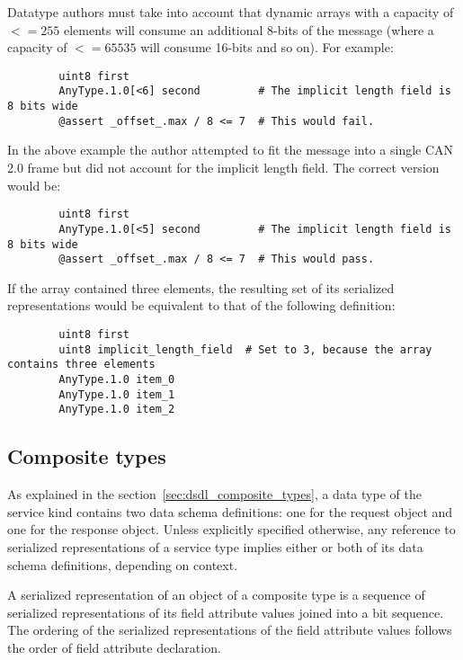 \begin{remark}
    Datatype authors must take into account that dynamic arrays with a capacity of $<=255$ elements will
    consume an additional 8-bits of the message (where a capacity of $<=65535$ will consume 16-bits and so on).
    For example:

    \begin{verbatim}
        uint8 first
        AnyType.1.0[<6] second         # The implicit length field is 8 bits wide
        @assert _offset_.max / 8 <= 7  # This would fail.
    \end{verbatim}

    In the above example the author attempted to fit the message into a single CAN 2.0 frame but
    did not account for the implicit length field. The correct version would be:

    \begin{verbatim}
        uint8 first
        AnyType.1.0[<5] second         # The implicit length field is 8 bits wide
        @assert _offset_.max / 8 <= 7  # This would pass.
    \end{verbatim}

    If the array contained three elements, the resulting set of its serialized representations would
    be equivalent to that of the following definition:

    \begin{verbatim}
        uint8 first
        uint8 implicit_length_field  # Set to 3, because the array contains three elements
        AnyType.1.0 item_0
        AnyType.1.0 item_1
        AnyType.1.0 item_2
    \end{verbatim}
\end{remark}

\subsection{Composite types}

As explained in the section~\ref{sec:dsdl_composite_types}, a data type of the service kind contains
two data schema definitions: one for the request object and one for the response object.
Unless explicitly specified otherwise, any reference to serialized representations of a service type
implies either or both of its data schema definitions, depending on context.

A serialized representation of an object of a composite type is a sequence of serialized representations of
its field attribute values joined into a bit sequence.
The ordering of the serialized representations of the field attribute values follows the order
of field attribute declaration.

